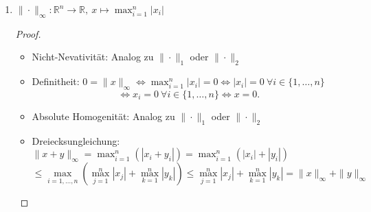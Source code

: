\documentclass[12pt]{extreport} %
\newcommand{\R}{\mathbb{R}}
\theoremstyle{named}
\theoremstyle{nnamed}
\theoremstyle{itshape}
\theoremstyle{normal}
\begin{document}
\begin{enumerate}
\begin{enumerate}
\begin{proof}
\begin{itemize}
\begin{align*}
								& g \colon [0, \infty)^n \mapsto [0, \infty), ~ y \mapsto \sum_{i=1}^{n} y_i \\
								& h \colon [0, \infty) \mapsto [0, \infty) , ~ z \mapsto \sqrt{z}
							\end{align*}
							Somit ist: $\|\cdot \|_2 = \left( h \circ g \circ f \right) \colon \R^n \rightarrow [0 \infty)$ 
						\item Definitheit: $0 = \|x\|_2 \iff \| x \|_2^2 = 0 \iff \sum_{i=1}^{n} x_i^2 = 0$, wobei $x_i^2 \geq 0$
						$$ \Rightarrow x_i = 0 ~\forall i \in \{1, \dotsc, n \} \iff x = 0$$
						\item Absolute Homogenität: Analog zu $\| \cdot \|_1$.
						\item Dreiecksungleichung: $\| x + y\|^2_2 = \left( x + y \right)^T \left( x + y \right) = x^T x  x^Ty + y^T x + y^T y $
						\begin{align*} 
							& = \| x \|^2_2 + 2 x^T y + \| y \|^2_2 \\
							& \leq \| x \|^2_2 + 2 | x^T y | + \| y \|^2_2 \\
							& \leq \| x \|^2_2 + 2 \| x\|_2 \|y \|_2 + \| y \|^2_2 \\
							& = \left( \|x\|_2 + \| y \|_2 \right)^2
						\end{align*}
							
					\end{itemize}
				\end{proof}
			\item $\| \cdot \|_{\infty} \colon \R^n \rightarrow \R, ~x \mapsto \max_{i =1}^{n} |x_i|$
				\begin{proof} ~\
					\begin{itemize}
						\item Nicht-Nevativität: Analog zu $\| \cdot \|_1$ oder $\| \cdot \|_2$
						\item Definitheit: $0 = \| x \|_{\infty}$$\iff\max_{i = 1}^{n} |x_i| = 0$$\iff|x_i| = 0 ~\forall i \in \{1, \dotsc, n \}$
							$$ \iff x_i = 0 ~\forall i \in \{1, \dotsc, n \} \iff x = 0. $$
						\item Absolute Homogenität: Analog zu $\| \cdot \|_1$ oder $\| \cdot \|_2$
						\item Dreiecksungleichung: $\| x + y\|_{\infty} = \max_{i=1}^{n} \left( \left| x_i + y_i \right| \right) = \max_{i=1}^{n} \left( |x_i| + |y_i| \right) $
							$$ \leq \max_{i = 1, \dotsc, n} \left( \max_{j=1}^{n} |x_j| + \max_{k=1}^{n} |y_k| \right) \leq \max_{j=1}^{n} |x_j| + \max_{k=1}^{n} |y_k|  = \| x \|_{\infty} + \| y \|_{\infty} $$ 
					\end{itemize}
				\end{proof}
		\end{enumerate}
\end{enumerate} ~\newline
\end{document}
